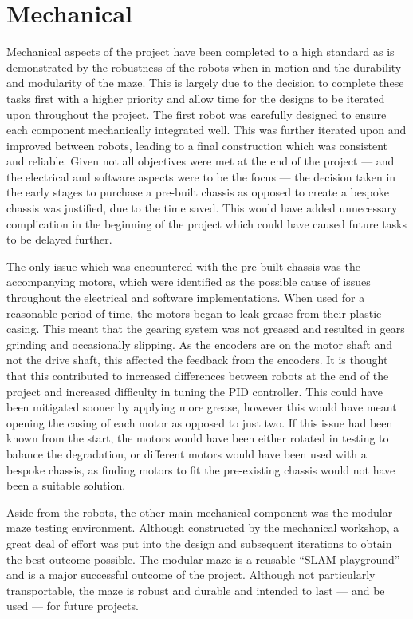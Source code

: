 \section{Mechanical}\label{eval/mech}
Mechanical aspects of the project have been completed to a
high standard as is demonstrated by the robustness of the robots when in
motion and the durability and modularity of the maze. This is largely due to the
decision to complete these tasks first with a higher priority and allow time for the
designs to be iterated upon throughout the project. The first robot was carefully
designed to ensure each component mechanically integrated well. This was further
iterated upon and improved between robots, leading to a final construction which was
consistent and reliable. Given not all objectives were met at the end of the project
--- and the electrical and software aspects were to be the focus --- the decision taken in the
early stages to purchase a pre-built chassis as opposed to create a bespoke chassis
was justified, due to the time saved. This would have added unnecessary complication
in the beginning of the project which could have caused future
tasks to be delayed further.

The only issue which was encountered with the pre-built chassis was the
accompanying motors, which were identified as the possible cause of
issues throughout the electrical and software implementations. When used
for a reasonable period of time, the motors began to leak grease from
their plastic casing. This meant that the gearing system was not greased
and resulted in gears grinding and occasionally slipping. As the
encoders are on the motor shaft and not the drive shaft, this affected
the feedback from the encoders. It is thought that this contributed to
increased differences between robots at the end of the project and
increased difficulty in tuning the PID controller. This could have been
mitigated sooner by applying more grease, however this would have meant
opening the casing of each motor as opposed to just two. If this issue
had been known from the start, the motors would have been either rotated
in testing to balance the degradation, or different motors would have
been used with a bespoke chassis, as finding motors to fit the pre-existing
chassis would not have been a suitable solution.

Aside from the robots, the other main mechanical component was the modular maze
testing environment. Although constructed by the mechanical workshop, a great deal of
effort was put into the design and subsequent iterations to obtain the best outcome
possible. The modular maze is a reusable ``SLAM playground'' and is a major
successful outcome of the project. Although not particularly transportable, the maze
is robust and durable and intended to last --- and be used --- for future projects.

